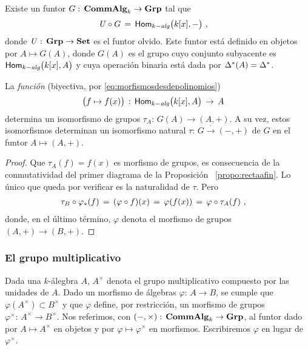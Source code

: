 \begin{coroRectaAfin}\label{coro:rectaafin}
	Existe un funtor $G:\,\CommAlg[k]\rightarrow\Grp$ tal que
	\begin{align*}
		\olvido\circ G & \,=\,\Homalg\big(k[x],-\big)
		\text{ ,}
	\end{align*}
	donde $\olvido:\,\Grp\rightarrow\Set$ es el funtor olvido. Este funtor
	est\'{a} definido en objetos por $A\mapsto G(A)$, donde
	$G(A)$ es el grupo cuyo conjunto subyacente es
	$\Homalg\big(k[x],A\big)$ y cuya operaci\'{o}n binaria est\'{a} dada
	por $\pull\Delta(A)=\pull\Delta$.

	La \emph{funci\'{o}n} (biyectiva, por
	\eqref{eq:morfismosdesdepolinomios})
	\begin{align*}
		\big(f\mapsto f(x)\big) & \,:\,\Homalg\big(k[x],A\big)
			\,\rightarrow\,A
	\end{align*}
	determina un isomorfismo de grupos $\tau_A:\,G(A)\rightarrow (A,+)$. A
	su vez, estos isomorfismos determinan un isomorfismo natural
	$\tau:\,G\xrightarrow\cdot (-,+)$ de $G$ en el funtor
	$A\mapsto (A,+)$.
\end{coroRectaAfin}

\begin{proof}
	Que $\tau_A(f)=f(x)$ es morfismo de grupos, es consecuencia de la
	conmutatividad del primer diagrama de la Proposici\'{o}n~%
	\ref{propo:rectaafin}. Lo \'{u}nico que queda por verificar es la
	naturalidad de $\tau$. Pero
	\begin{align*}
		\tau_B\circ\push\varphi(f) & \,=\,(\varphi\circ f)(x)\,=\,
			\varphi(f(x))\,=\,\varphi\circ\tau_A(f)
		\text{ ,}
	\end{align*}
	donde, en el \'{u}ltimo t\'{e}rmino, $\varphi$ denota el morfismo de
	grupos $(A,+)\rightarrow(B,+)$.
\end{proof}

\subsubsection{El grupo multiplicativo}

Dada una $k$-\'{a}legbra $A$, $A^\times$ denota el grupo multiplicativo
compuesto por las unidades de $A$. Dado un morfismo de \'{a}lgebras
$\varphi:\,A\rightarrow B$, se cumple que $\varphi(A^\times)\subset B^\times$ y
que $\varphi$ define, por restricci\'{o}n, un morfismo de grupos
$\varphi^\times:\,A^\times\rightarrow B^\times$. Nos referimos, con
$(-,\times):\,\CommAlg[k]\rightarrow\Grp$, al funtor dado por
$A\mapsto A^\times$ en objetos y por $\varphi\mapsto\varphi^\times$ en
morfismos. Escribiremos $\varphi$ en lugar de $\varphi^\times$.

